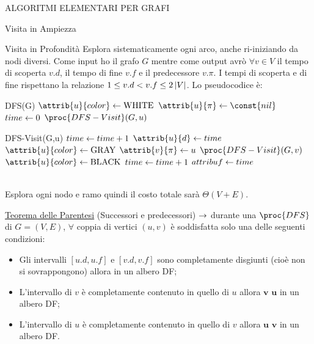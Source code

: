 \documentclass[8pt]{extarticle}
\begin{document}
\begin{formulario}
\begin{myParagraph}{ALGORITMI ELEMENTARI PER GRAFI}
\begin{subParagraph}{Visita in Ampiezza}
		\end{subParagraph}
		\begin{subParagraph}{Visita in Profondità}
Esplora sistematicamente ogni arco, anche ri-iniziando da nodi diversi. Come input ho il grafo $G$ mentre come output avrò $\forall v\in V$ il tempo di scoperta $v.d$, il tempo di fine $v.f$ e il predecessore $v.\pi$. I tempi di scoperta e di fine rispettano la relazione $1\leq v.d < v.f \leq 2\left\vert V \right\vert$. Lo pseudocodice è:
			\begin{code}{DFS(G)}
\li {}
	\li $\attrib{u}{color}\get \text{WHITE}$
	\li $\attrib{u}{\pi}\get \const{nil}$
\END
\li $time\leftarrow0$
\li {}
	\li {}
		\li $\proc{DFS-Visit}(G,u)$
	\END
\END
			\end{code} 
			\begin{code}{DFS-Visit(G,u)}
\li $time\leftarrow time+1$ 
\li $\attrib{u}{d}\get time$ 
\li $\attrib{u}{color}\get \text{GRAY}$ 
\li {}
	\li {}
		\li $\attrib{v}{\pi}\get u$
		\li $\proc{DFS-Visit}(G,v)$ 
	\END
\END
\li $\attrib{u}{color}\get \text{BLACK}$ 
\li $time \leftarrow time+1$ 
\li $attrib{u}{f}\leftarrow time$
			\end{code}
\\
Esplora ogni nodo e ramo quindi il costo totale sarà $\Theta(V+E)$.
			\begin{Descr} 
	\item[\underline{Teorema delle Parentesi}] (Successori e predecessori) $\rightarrow$ durante una $\proc{DFS}$ di $G=(V,E)$, $\forall$ coppia di vertici $(u,v)$ è soddisfatta solo una delle seguenti condizioni:
				\begin{itemize} 
					\item Gli intervalli $[u.d,u.f]$ e $[v.d,v.f]$ sono completamente disgiunti (cioè non si sovrappongono) allora  in un albero DF;
					\item L'intervallo di $v$ è completamente contenuto in quello di $u$ allora $\bm{v}$  $\bm{u}$ in un albero DF;
					\item L'intervallo di $u$ è completamente contenuto in quello di $v$ allora $\bm{u}$  $\bm{v}$ in un albero DF.

\end{itemize}
\end{Descr}
\end{subParagraph}
\end{myParagraph}
\end{formulario}
\end{document}
